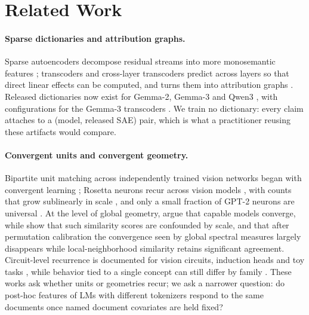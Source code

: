 \section{Related Work}\label{sec:related}

\paragraph{Sparse dictionaries and attribution graphs.}
Sparse autoencoders decompose residual streams into more monosemantic features
\citep{cunningham2023sparse,bricken2023monosemanticity,rajamanoharan2024gated,templeton2024scaling};
transcoders and cross-layer transcoders predict across layers so that direct linear effects
can be computed, and \circuittracer{} turns them into attribution graphs
\citep{ameisen2025attribution,lindsey2025biology,hanna2025circuit-tracer}. Released
dictionaries now exist for Gemma-2, Gemma-3 and Qwen3
\citep{lieberum2024gemmascope,mcdougall2025gemmascope2,hanna2025qwen-transcoders,bluelightai2025qwen-clt},
with \circuittracer{} configurations for the Gemma-3 transcoders \citep{hanna2025gemma-scope-2-transcoders}.
We train no dictionary: every claim attaches to a (model, released SAE) pair, which is what a
practitioner reusing these artifacts would compare.

\paragraph{Convergent units and convergent geometry.}
Bipartite unit matching across independently trained vision networks began with convergent
learning \citep{li2016convergent}; Rosetta neurons recur across vision models
\citep{dravid2023rosetta}, with counts that grow sublinearly in scale \citep{dravid2026divergent},
and only a small fraction of GPT-2 neurons are universal \citep{gurnee2024universal}. At the level
of global geometry, \citet{huh2024platonic} argue that capable models converge, while
\citet{groger2026aristotelian} show that such similarity scores are confounded by scale, and that after
permutation calibration the convergence seen by global spectral measures largely disappears while
local-neighborhood similarity retains significant agreement. Circuit-level recurrence is
documented for vision circuits, induction heads and toy tasks
\citep{olah2020zoom,olsson2022context,chughtai2023toy}, while behavior tied to a single concept
can still differ by family \citep{soligo2026distress}. These works ask whether units or geometries recur; we
ask a narrower question: do post-hoc features of LMs with different tokenizers respond to
the same documents once named document covariates are held fixed?

